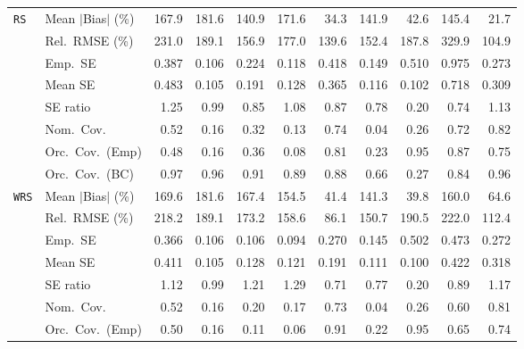 \begin{landscape}
\begin{longtable}{llrrrrrrrrr}
\addlinespace[2pt]
\quad \texttt{RS} & Mean $|$Bias$|$ (\%) & 167.9 & 181.6 & 140.9 & 171.6 & \cellcolor{ranktwo}34.3 & 141.9 & \cellcolor{rankthree}42.6 & 145.4 & \cellcolor{rankone}21.7 \\
 & Rel.\ RMSE (\%) & 231.0 & 189.1 & 156.9 & 177.0 & \cellcolor{ranktwo}139.6 & \cellcolor{rankthree}152.4 & 187.8 & 329.9 & \cellcolor{rankone}104.9 \\
 & Emp.\ SE & 0.387 & 0.106 & 0.224 & 0.118 & 0.418 & 0.149 & 0.510 & 0.975 & 0.273 \\
 & Mean SE & 0.483 & 0.105 & 0.191 & 0.128 & 0.365 & 0.116 & 0.102 & 0.718 & 0.309 \\
 & SE ratio & 1.25 & \cellcolor{rankone}0.99 & 0.85 & \cellcolor{ranktwo}1.08 & \cellcolor{rankthree}0.87 & 0.78 & 0.20 & 0.74 & \cellcolor{rankthree}1.13 \\
 & Nom.\ Cov. & 0.52 & 0.16 & 0.32 & 0.13 & \cellcolor{ranktwo}0.74 & 0.04 & 0.26 & \cellcolor{rankthree}0.72 & \cellcolor{rankone}0.82 \\
 & Orc.\ Cov.\ (Emp) & 0.48 & 0.16 & 0.36 & 0.08 & \cellcolor{rankthree}0.81 & 0.23 & \cellcolor{rankone}0.95 & \cellcolor{ranktwo}0.87 & 0.75 \\
 & Orc.\ Cov.\ (BC) & \cellcolor{ranktwo}0.97 & \cellcolor{rankone}0.96 & \cellcolor{rankthree}0.91 & 0.89 & 0.88 & 0.66 & 0.27 & 0.84 & \cellcolor{rankone}0.96 \\
\addlinespace[2pt]
\quad \texttt{WRS} & Mean $|$Bias$|$ (\%) & 169.6 & 181.6 & 167.4 & 154.5 & \cellcolor{ranktwo}41.4 & 141.3 & \cellcolor{rankone}39.8 & 160.0 & \cellcolor{rankthree}64.6 \\
 & Rel.\ RMSE (\%) & 218.2 & 189.1 & 173.2 & 158.6 & \cellcolor{rankone}86.1 & \cellcolor{rankthree}150.7 & 190.5 & 222.0 & \cellcolor{ranktwo}112.4 \\
 & Emp.\ SE & 0.366 & 0.106 & 0.106 & 0.094 & 0.270 & 0.145 & 0.502 & 0.473 & 0.272 \\
 & Mean SE & 0.411 & 0.105 & 0.128 & 0.121 & 0.191 & 0.111 & 0.100 & 0.422 & 0.318 \\
 & SE ratio & \cellcolor{rankthree}1.12 & \cellcolor{rankone}0.99 & 1.21 & 1.29 & 0.71 & 0.77 & 0.20 & \cellcolor{ranktwo}0.89 & 1.17 \\
 & Nom.\ Cov. & 0.52 & 0.16 & 0.20 & 0.17 & \cellcolor{ranktwo}0.73 & 0.04 & 0.26 & \cellcolor{rankthree}0.60 & \cellcolor{rankone}0.81 \\
 & Orc.\ Cov.\ (Emp) & 0.50 & 0.16 & 0.11 & 0.06 & \cellcolor{ranktwo}0.91 & 0.22 & \cellcolor{rankone}0.95 & 0.65 & \cellcolor{rankthree}0.74 \\

\end{longtable}
\end{landscape}

